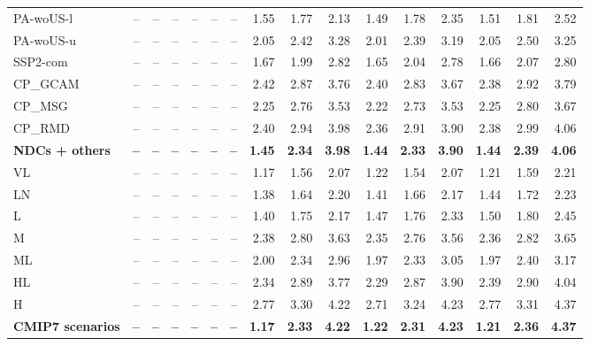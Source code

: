\begin{table}[tp]
{\begin{tabular}{lrrrrrrrrrrrrrrr}
\textcolor[HTML]{8ab17d}{PA-woUS-l} & -- & -- & -- & -- & -- & -- & 1.55 & 1.77 & 2.13 & 1.49 & 1.78 & 2.35 & 1.51 & 1.81 & 2.52 \\
\textcolor[HTML]{52796f}{PA-woUS-u} & -- & -- & -- & -- & -- & -- & 2.05 & 2.42 & 3.28 & 2.01 & 2.39 & 3.19 & 2.05 & 2.50 & 3.25 \\
\textcolor[HTML]{c87828}{SSP2-com} & -- & -- & -- & -- & -- & -- & 1.67 & 1.99 & 2.82 & 1.65 & 2.04 & 2.78 & 1.66 & 2.07 & 2.80 \\
\textcolor[HTML]{8a4b2a}{CP\_GCAM} & -- & -- & -- & -- & -- & -- & 2.42 & 2.87 & 3.76 & 2.40 & 2.83 & 3.67 & 2.38 & 2.92 & 3.79 \\
\textcolor[HTML]{b6652d}{CP\_MSG} & -- & -- & -- & -- & -- & -- & 2.25 & 2.76 & 3.53 & 2.22 & 2.73 & 3.53 & 2.25 & 2.80 & 3.67 \\
\textcolor[HTML]{d4883a}{CP\_RMD} & -- & -- & -- & -- & -- & -- & 2.40 & 2.94 & 3.98 & 2.36 & 2.91 & 3.90 & 2.38 & 2.99 & 4.06 \\
\midrule
\textbf{NDCs + others} & \textbf{--} & \textbf{--} & \textbf{--} & \textbf{--} & \textbf{--} & \textbf{--} & \textbf{1.45} & \textbf{2.34} & \textbf{3.98} & \textbf{1.44} & \textbf{2.33} & \textbf{3.90} & \textbf{1.44} & \textbf{2.39} & \textbf{4.06} \\
\midrule
\textcolor[HTML]{bddcf4}{VL} & -- & -- & -- & -- & -- & -- & 1.17 & 1.56 & 2.07 & 1.22 & 1.54 & 2.07 & 1.21 & 1.59 & 2.21 \\
\textcolor[HTML]{a9cce9}{LN} & -- & -- & -- & -- & -- & -- & 1.38 & 1.64 & 2.20 & 1.41 & 1.66 & 2.17 & 1.44 & 1.72 & 2.23 \\
\textcolor[HTML]{93bbe0}{L} & -- & -- & -- & -- & -- & -- & 1.40 & 1.75 & 2.17 & 1.47 & 1.76 & 2.33 & 1.50 & 1.80 & 2.45 \\
\textcolor[HTML]{7ba5d4}{M} & -- & -- & -- & -- & -- & -- & 2.38 & 2.80 & 3.63 & 2.35 & 2.76 & 3.56 & 2.36 & 2.82 & 3.65 \\
\textcolor[HTML]{4c6fb8}{ML} & -- & -- & -- & -- & -- & -- & 2.00 & 2.34 & 2.96 & 1.97 & 2.33 & 3.05 & 1.97 & 2.40 & 3.17 \\
\textcolor[HTML]{6282be}{HL} & -- & -- & -- & -- & -- & -- & 2.34 & 2.89 & 3.77 & 2.29 & 2.87 & 3.90 & 2.39 & 2.90 & 4.04 \\
\textcolor[HTML]{3b0f70}{H} & -- & -- & -- & -- & -- & -- & 2.77 & 3.30 & 4.22 & 2.71 & 3.24 & 4.23 & 2.77 & 3.31 & 4.37 \\
\midrule
\textbf{CMIP7 scenarios} & \textbf{--} & \textbf{--} & \textbf{--} & \textbf{--} & \textbf{--} & \textbf{--} & \textbf{1.17} & \textbf{2.33} & \textbf{4.22} & \textbf{1.22} & \textbf{2.31} & \textbf{4.23} & \textbf{1.21} & \textbf{2.36} & \textbf{4.37} \\

\end{tabular}}
\end{table}
